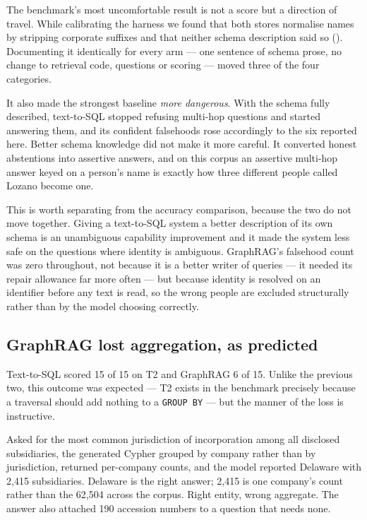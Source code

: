 The benchmark's most uncomfortable result is not a score but a direction of
travel. While calibrating the harness we found that both stores normalise names
by stripping corporate suffixes and that neither schema description said so
(). Documenting it identically for every arm --- one sentence
of schema prose, no change to retrieval code, questions or scoring --- moved
three of the four categories.

It also made the strongest baseline \emph{more dangerous}. With the schema fully
described, text-to-SQL stopped refusing multi-hop questions and started answering
them, and its confident falsehoods rose accordingly to the six reported here.
Better schema knowledge did not make it more careful. It converted honest
abstentions into assertive answers, and on this corpus an assertive multi-hop
answer keyed on a person's name is exactly how three different people called
Lozano become one.

This is worth separating from the accuracy comparison, because the two do not
move together. Giving a text-to-SQL system a better description of its own schema
is an unambiguous capability improvement and it made the system less safe on the
questions where identity is ambiguous. GraphRAG's falsehood count was zero
throughout, not because it is a better writer of queries --- it needed its repair
allowance far more often --- but because identity is resolved on an identifier
before any text is read, so the wrong people are excluded structurally rather
than by the model choosing correctly.

\subsection{GraphRAG lost aggregation, as predicted}

Text-to-SQL scored 15 of 15 on T2 and GraphRAG 6 of 15. Unlike the previous two,
this outcome was expected --- T2 exists in the benchmark precisely because a
traversal should add nothing to a \texttt{GROUP BY} --- but the manner of the loss
is instructive.

Asked for the most common jurisdiction of incorporation among all disclosed
subsidiaries, the generated Cypher grouped by company rather than by jurisdiction,
returned per-company counts, and the model reported Delaware with 2{,}415
subsidiaries. Delaware is the right answer; 2{,}415 is one company's count rather
than the 62{,}504 across the corpus. Right entity, wrong aggregate. The answer
also attached 190 accession numbers to a question that needs none.

